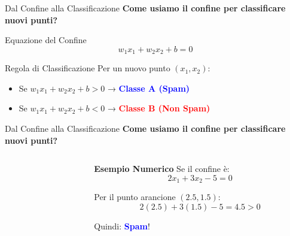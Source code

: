 \documentclass[aspectratio=169]{beamer}
\begin{document}
%
\begin{frame}{Dal Confine alla Classificazione}
\textbf{Come usiamo il confine per classificare nuovi punti?}

\vspace{0.5cm}

\begin{block}{Equazione del Confine}
$$w_1 x_1 + w_2 x_2 + b = 0$$
\end{block}

\begin{block}{Regola di Classificazione}
Per un nuovo punto $(x_1, x_2)$:
\begin{itemize}
    \item Se $w_1 x_1 + w_2 x_2 + b > 0$ → \textcolor{blue}{\textbf{Classe A (Spam)}}
    \item Se $w_1 x_1 + w_2 x_2 + b < 0$ → \textcolor{red}{\textbf{Classe B (Non Spam)}}
\end{itemize}
\end{block}

\end{frame}
%
%
\begin{frame}{Dal Confine alla Classificazione}
\textbf{Come usiamo il confine per classificare nuovi punti?}
\vspace{0.5cm}

\begin{columns}
\begin{column}{0.5\textwidth}
\begin{center}
\end{center}
\end{column}
\begin{column}{0.5\textwidth}
\textbf{Esempio Numerico}
\vspace{0.2cm}
Se il confine è:
$$2x_1 + 3x_2 - 5 = 0$$

Per il punto arancione $(2.5, 1.5)$:
$$2(2.5) + 3(1.5) - 5 = 4.5 > 0$$

Quindi: \textcolor{blue}{\textbf{Spam}}!
\end{column}
\end{columns}
\end{frame}
\end{document}
